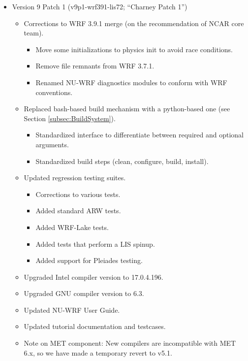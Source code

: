 \begin{itemize}
\item Version 9 Patch 1 (v9p1-wrf391-lis72; ``Charney Patch 1'')
\begin{itemize}
\item Corrections to WRF 3.9.1 merge (on the recommendation of NCAR core team).
   \begin{itemize}
    \item Move some initializations to physics init to avoid race conditions.
    \item Remove file remnants from WRF 3.7.1.
    \item Renamed NU-WRF diagnostics modules to conform with WRF conventions.
   \end{itemize}
\item Replaced bash-based build mechanism with a python-based one (see Section \ref{subsec:BuildSystem}).
   \begin{itemize}
      \item Standardized interface to differentiate between required and optional arguments.
      \item Standardized build steps (clean, configure, build, install).
   \end{itemize}
\item  Updated regression testing suites.
   \begin{itemize}
     \item Corrections to various tests.
      \item Added standard ARW tests.
      \item Added WRF-Lake tests.
      \item Added tests that perform a LIS spinup.
      \item Added support for Pleiades testing.
   \end{itemize}
\item Upgraded Intel compiler version to 17.0.4.196.
\item Upgraded GNU compiler version to 6.3.
\item Updated NU-WRF User Guide.
\item Updated tutorial documentation and testcases.
\item Note on MET component: New compilers are incompatible with MET 6.x, so we have made a temporary revert to v5.1.
\end{itemize}

\end{itemize}


